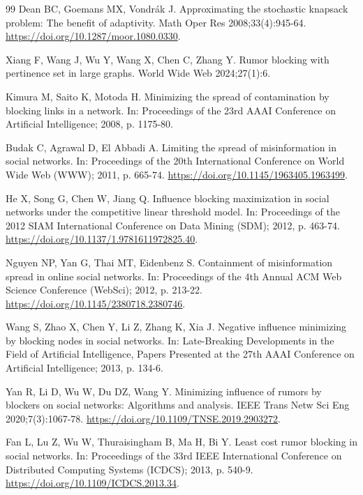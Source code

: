\documentclass[preprint,11pt]{elsarticle}
\theoremstyle{definition}
\theoremstyle{remark}
\begin{document}
\begin{thebibliography}{99}
Dean BC, Goemans MX, Vondrák J. Approximating the stochastic knapsack problem: The benefit of adaptivity. Math Oper Res 2008;33(4):945-64. \url{https://doi.org/10.1287/moor.1080.0330}.

Xiang F, Wang J, Wu Y, Wang X, Chen C, Zhang Y. Rumor blocking with pertinence set in large graphs. World Wide Web 2024;27(1):6.

Kimura M, Saito K, Motoda H. Minimizing the spread of contamination by blocking links in a network. In: Proceedings of the 23rd AAAI Conference on Artificial Intelligence; 2008, p. 1175-80.

Budak C, Agrawal D, El Abbadi A. Limiting the spread of misinformation in social networks. In: Proceedings of the 20th International Conference on World Wide Web (WWW); 2011, p. 665-74. \url{https://doi.org/10.1145/1963405.1963499}.

He X, Song G, Chen W, Jiang Q. Influence blocking maximization in social networks under the competitive linear threshold model. In: Proceedings of the 2012 SIAM International Conference on Data Mining (SDM); 2012, p. 463-74. \url{https://doi.org/10.1137/1.9781611972825.40}.

Nguyen NP, Yan G, Thai MT, Eidenbenz S. Containment of misinformation spread in online social networks. In: Proceedings of the 4th Annual ACM Web Science Conference (WebSci); 2012, p. 213-22. \url{https://doi.org/10.1145/2380718.2380746}.

Wang S, Zhao X, Chen Y, Li Z, Zhang K, Xia J. Negative influence minimizing by blocking nodes in social networks. In: Late-Breaking Developments in the Field of Artificial Intelligence, Papers Presented at the 27th AAAI Conference on Artificial Intelligence; 2013, p. 134-6.

Yan R, Li D, Wu W, Du DZ, Wang Y. Minimizing influence of rumors by blockers on social networks: Algorithms and analysis. IEEE Trans Netw Sci Eng 2020;7(3):1067-78. \url{https://doi.org/10.1109/TNSE.2019.2903272}.

Fan L, Lu Z, Wu W, Thuraisingham B, Ma H, Bi Y. Least cost rumor blocking in social networks. In: Proceedings of the 33rd IEEE International Conference on Distributed Computing Systems (ICDCS); 2013, p. 540-9. \url{https://doi.org/10.1109/ICDCS.2013.34}.


\end{thebibliography}
\end{document}

